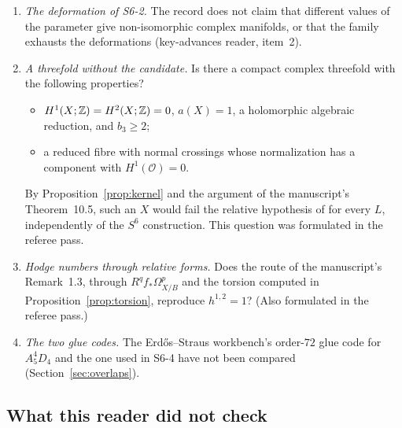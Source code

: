\begin{enumerate}[label=\arabic*.]
\item \emph{The deformation of S6-2.} The record does not claim that different values of the parameter give non-isomorphic complex manifolds, or that the family exhausts the deformations (key-advances reader, item~2).
\item \emph{A threefold without the candidate.} Is there a compact complex threefold with the following properties?
\begin{itemize}
\item $H^1(X;\mathbb{Z})=H^2(X;\mathbb{Z})=0$, $a(X)=1$, a holomorphic algebraic reduction, and $b_3\ge2$;
\item a reduced fibre with normal crossings whose normalization has a component with $H^1(\mathcal O)=0$.
\end{itemize}
By Proposition~\ref{prop:kernel} and the argument of the manuscript's Theorem~10.5, such an $X$ would fail the relative hypothesis of \cite{CDP20} for every $L$, independently of the $S^6$ construction. This question was formulated in the referee pass.
\item \emph{Hodge numbers through relative forms.} Does the route of the manuscript's Remark~1.3, through $R^qf_*\Omega^p_{X/B}$ and the torsion computed in Proposition~\ref{prop:torsion}, reproduce $h^{1,2}=1$? (Also formulated in the referee pass.)
\item \emph{The two glue codes.} The Erdős--Straus workbench's order-$72$ glue code for $A_5^4D_4$ and the one used in S6-4 have not been compared (Section~\ref{sec:overlaps}).
\end{enumerate}

\subsection{What this reader did not check}

